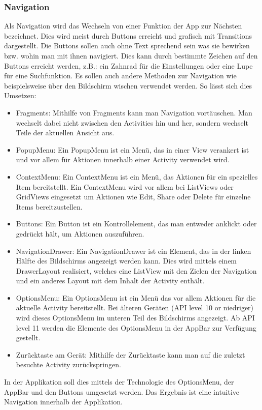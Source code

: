 \documentclass[FIPLY_base.tex]{subfiles}
\begin{document}
\subsubsection{Navigation}
Als Navigation wird das Wechseln von einer Funktion der App zur Nächsten bezeichnet. Dies wird meist durch Buttons erreicht und grafisch mit Transitions dargestellt.
Die Buttons sollen auch ohne Text sprechend sein was sie bewirken bzw. wohin man mit ihnen navigiert. Dies kann durch bestimmte Zeichen auf den Buttons erreicht werden, z.B.: ein Zahnrad für die Einstellungen oder eine Lupe für eine Suchfunktion. Es sollen auch andere Methoden zur Navigation wie beispielsweise über den Bildschirm wischen verwendet werden.
So lässt sich dies Umsetzen:
\begin{itemize}
	\item Fragments: Mithilfe von Fragments kann man Navigation vortäuschen. Man wechselt dabei nicht zwischen den Activities hin und her, sondern wechselt Teile der aktuellen Ansicht aus.
	\item PopupMenu: Ein PopupMenu ist ein Menü, das in einer View verankert ist und vor allem für Aktionen innerhalb einer Activity verwendet wird.
	\item ContextMenu: Ein ContextMenu ist ein Menü, das Aktionen für ein spezielles Item bereitstellt. Ein ContextMenu wird vor allem bei ListViews oder GridViews eingesetzt um Aktionen wie Edit, Share oder Delete für einzelne Items bereitzustellen.
	\item Buttons: Ein Button ist ein Kontrollelement, das man entweder anklickt oder gedrückt hält, um Aktionen auszuführen.
	\item NavigationDrawer: Ein NavigationDrawer ist ein Element, das in der linken Hälfte des Bildschirms angezeigt werden kann. Dies wird mittels einem DrawerLayout realisiert, welches eine ListView mit den Zielen der Navigation und ein anderes Layout mit dem Inhalt der Activity enthält.
	\item OptionsMenu: Ein OptionsMenu ist ein Menü das vor allem Aktionen für die aktuelle Activity bereitstellt. 
	Bei älteren Geräten (API level 10 or niedriger) wird dieses OptionsMenu im unteren Teil des Bildschirms angezeigt.
	Ab API level 11 werden die Elemente des OptionsMenu in der AppBar zur Verfügung gestellt.
	\item Zurücktaste am Gerät: Mithilfe der Zurücktaste kann man auf die zuletzt besuchte Activity zurückspringen.
\end{itemize}
In der Applikation soll dies mittels der Technologie des OptionsMenu, der AppBar und den Buttons umgesetzt werden. Das Ergebnis ist eine intuitive Navigation innerhalb der Applikation.
\end{document}
